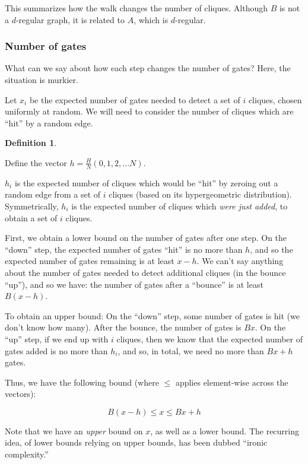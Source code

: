 \documentclass[12pt]{article}
\theoremstyle{definition}
\newtheorem{defn}{Definition}[section]
\begin{document}
This summarizes how the walk changes the number of cliques.
Although $B$ is not a $d$-regular graph, it is related to $A$, which is $d$-regular.

\subsubsection{Number of gates}

What can we say about how each step changes the number of gates? Here, the situation is murkier.

Let $x_i$ be the expected number of gates needed to detect a set of $i$ cliques, chosen
uniformly at random. We will need to consider the number of cliques which are ``hit'' by
a random edge.

\begin{defn} \label{defn:sequenceVector}

Define the vector $h = \frac{H}{N}(0, 1, 2, ... N)$.

$h_i$ is the expected number of cliques which would be ``hit'' by zeroing out a random edge
from a set of $i$ cliques (based on its hypergeometric distribution).
Symmetrically, $h_i$ is the expected number of cliques which {\em were just added}, to obtain a
set of $i$ cliques.

\end{defn}

First, we obtain a lower bound on the number of gates after one step.
On the ``down'' step, the expected number of gates ``hit'' is no more than $h$,
and so the expected number of gates remaining is at least $x - h$.
We can't say anything about the number of gates needed to detect additional cliques (in the bounce ``up''), and so we have:
the number of gates after a ``bounce'' is at least $B(x-h)$.

To obtain an upper bound: On the ``down'' step, some number of gates is hit (we don't know how many).
After the bounce, the number of gates is $Bx$.
On the ``up'' step,
if we end up with $i$ cliques, then we know that the expected number of gates added is no more than $h_i$,
and so, in total, we need no more than $Bx+h$ gates.

Thus, we have the following bound (where $\le$ applies element-wise across the vectors):

\begin{equation}
\label{eq:matrixBounds}
B(x - h) \le x \le Bx + h
\end{equation}

Note that we have an {\em upper} bound on $x$, as well
as a lower bound.
The recurring idea, of lower bounds relying on upper bounds,
has been dubbed ``ironic complexity.''
\cite{aaronson_pnp}
\end{document}
